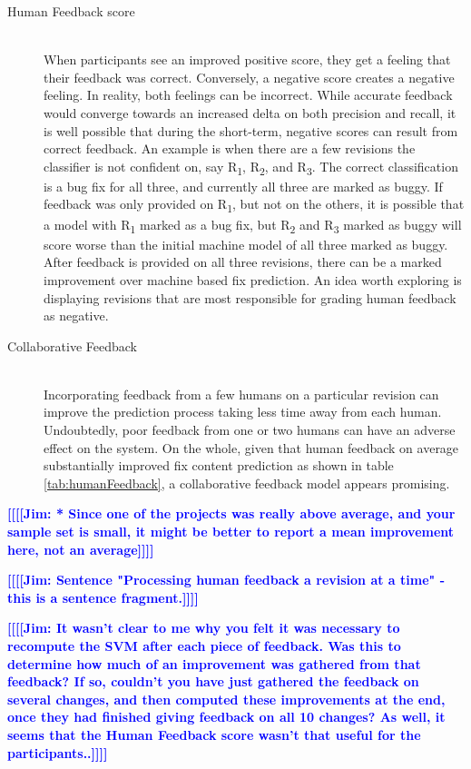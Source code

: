 \documentclass[10pt, conference, letterpaper, compsocconf]{IEEEtran}
\newcommand{\todoc}[2]{{\textcolor{#1} {\textbf{[[#2]]}}}}
\newcommand{\todoblue}[1]{\todoc{blue}{\textbf{[[#1]]}}}
\newcommand{\jim}[1]{\todoblue{Jim: #1}}
\begin{document}
\begin{description}
\item[Human Feedback score] \hfill \\
When participants see an improved positive score, they get a feeling that their feedback was correct. Conversely, a negative score creates a negative feeling.
In reality, both feelings can be incorrect.
While accurate feedback would converge towards an increased delta on both precision and recall,
it is well possible that during the short-term, negative scores can result from correct feedback.
An example is when there are a few revisions the classifier is not confident on, say R\textsubscript{1}, R\textsubscript{2},
and R\textsubscript{3}. The correct classification is a bug fix for all three, and currently all three are marked as buggy.
If feedback was only provided on R\textsubscript{1}, but not on the others, it is possible that a model with R\textsubscript{1} marked as a bug fix,
but R\textsubscript{2} and R\textsubscript{3} marked as buggy will score worse than the initial machine model of all three marked as buggy.
After feedback is provided on all three revisions, there can be a marked improvement over machine based fix prediction.
An idea worth exploring is displaying revisions that are most responsible for grading human feedback as negative.
\item[Collaborative Feedback] \hfill \\
Incorporating feedback from a few humans on a particular revision can improve the prediction process taking less time away from each human.
Undoubtedly, poor feedback from one or two humans can have an adverse effect on the system.
On the whole, given that human feedback on average substantially improved fix content prediction as shown in table \ref{tab:humanFeedback}, a collaborative feedback model appears promising.
\end{description}

\jim{* Since one of the projects was really above average, and your sample set is small, it might be better to report a mean improvement here, not an average}

\jim{Sentence "Processing human feedback a revision at a time" - this is a sentence fragment.}

\jim{It wasn't clear to me why you felt it was necessary to recompute the SVM after each piece of feedback. Was this to determine how much of an improvement was gathered from that feedback? If so, couldn't you have just gathered the feedback on several changes, and then computed these improvements at the end, once they had finished giving feedback on all 10 changes? As well, it seems that the Human Feedback score wasn't that useful for the participants..}
\end{document}
